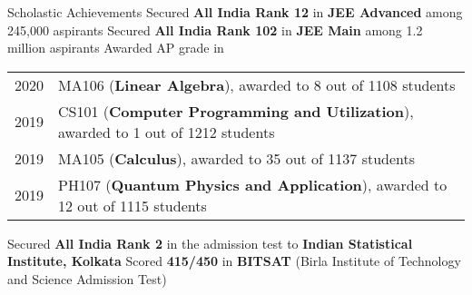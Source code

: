 \begin{rubric}{Scholastic Achievements}
    \entry*[2019] Secured \textbf{All India Rank 12} in \textbf{JEE Advanced} among 245,000 aspirants
    \entry*[2019\phantom{}] Secured \textbf{All India Rank 102} in \textbf{JEE Main} among 1.2 million aspirants
    \entry* Awarded AP grade in
        
        \begin{tabular}{@{}ll}
           2020 & MA106 (\textbf{Linear Algebra}), awarded to 8 out of 1108 students \\
           2019 & CS101 (\textbf{Computer Programming and Utilization}), awarded to 1 out of 1212 students \\
           2019 & MA105 (\textbf{Calculus}), awarded to 35 out of 1137 students \\
           2019 & PH107 (\textbf{Quantum Physics and Application}), awarded to 12 out of 1115 students \\
        \end{tabular}
    \entry*[2019\phantom{}] Secured \textbf{All India Rank 2} in the admission test to \textbf{Indian Statistical Institute, Kolkata}
    \entry*[2019] Scored \textbf{415/450} in \textbf{BITSAT} (Birla Institute of Technology and Science Admission Test)
\end{rubric}